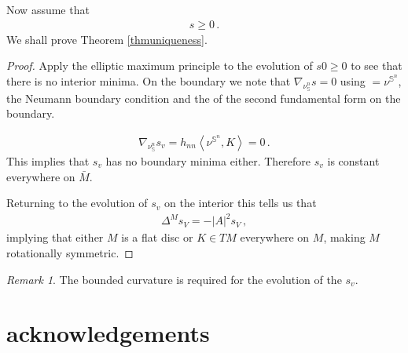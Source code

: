 \documentclass[10pt]{amsart}
\newcommand{\IP}[2]{\left< #1 , #2 \right>}
\renewcommand{\S}{\ensuremath{\mathbb{S}}}
\theoremstyle{remark}
\newtheorem*{rmk}{Remark}
\begin{document}
Now assume that
\begin{align}
	s \geq 0 \label{graphcondition}\,.
\end{align}
We shall prove Theorem \ref{thmuniqueness}.

\begin{proof}
Apply the elliptic maximum principle to the evolution of $s0\geq 0$ to see that
there is no interior minima. On the boundary we note that $\nabla_{\nu_\S^n}s=0$ using
$=\nu^{\S^n}$, the Neumann boundary condition and the  of the second fundamental form on the boundary. 

\begin{align*}
\nabla_{\nu_\S^n}s_v = h_{nn}\IP{\nu^{\S^n}}{K} = 0\,.
\end{align*}
This implies that $s_v$ has no boundary minima either.  Therefore $s_v$ is constant everywhere on $\bar M$.

Returning to the evolution of $s_v$ on the interior this tells us that
\begin{align*}
{\Delta}^M s_V = - |A|^2 s_V\,,
\end{align*}
implying that either $M$ is a flat disc or $K\in TM$ everywhere on $M$, making $M$ rotationally symmetric. 
\end{proof}

\begin{rmk}
The bounded curvature is required for the evolution of the $s_v$.
\end{rmk}


\section*{acknowledgements}



\end{document}
